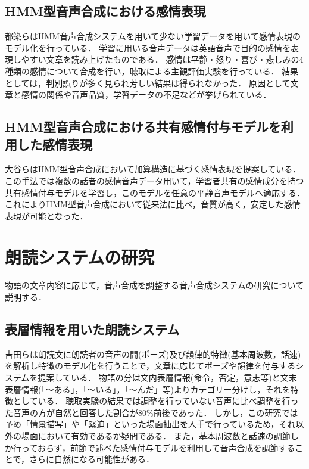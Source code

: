 \subsection{HMM型音声合成における感情表現}\label{hmm-emotion}
都築ら\cite{tsuduki}はHMM音声合成システムを用いて少ない学習データを用いて感情表現のモデル化を行っている．
学習に用いる音声データは英語音声で目的の感情を表現しやすい文章を読み上げたものである．
感情は平静・怒り・喜び・悲しみの4種類の感情について合成を行い，聴取による主観評価実験を行っている．
結果としては，判別誤りが多く見られ芳しい結果は得られなかった．
原因として文章と感情の関係や音声品質，学習データの不足などが挙げられている．

\subsection{HMM型音声合成における共有感情付与モデルを利用した感情表現}
大谷\cite{otani}らはHMM型音声合成において加算構造に基づく感情表現を提案している．
この手法では複数の話者の感情音声データ用いて，学習者共有の感情成分を持つ共有感情付与モデルを学習し，このモデルを任意の平静音声モデルへ適応する．
これによりHMM型音声合成において従来法に比べ，音質が高く，安定した感情表現が可能となった．



\section{朗読システムの研究}
物語の文章内容に応じて，音声合成を調整する音声合成システムの研究について説明する．

\subsection{表層情報を用いた朗読システム}
吉田ら\cite{yoshida}は朗読文に朗読者の音声の間(ポーズ)及び韻律的特徴(基本周波数，話速)を解析し特徴のモデル化を行うことで，文章に応じてポーズや韻律を付与するシステムを提案している．
物語の分は文内表層情報(命令，否定，意志等)と文末表層情報(「〜ある」，「〜いる」，「〜んだ」等)よりカテゴリー分けし，それを特徴としている．
聴取実験の結果では調整を行っていない音声に比べ調整を行った音声の方が自然と回答した割合が80\%前後であった．
しかし，この研究では予め「情景描写」や「緊迫」といった場面抽出を人手で行っているため，それ以外の場面において有効であるか疑問である．
また，基本周波数と話速の調節しか行っておらず，前節で述べた感情付与モデルを利用して音声合成を調節することで，さらに自然になる可能性がある．

